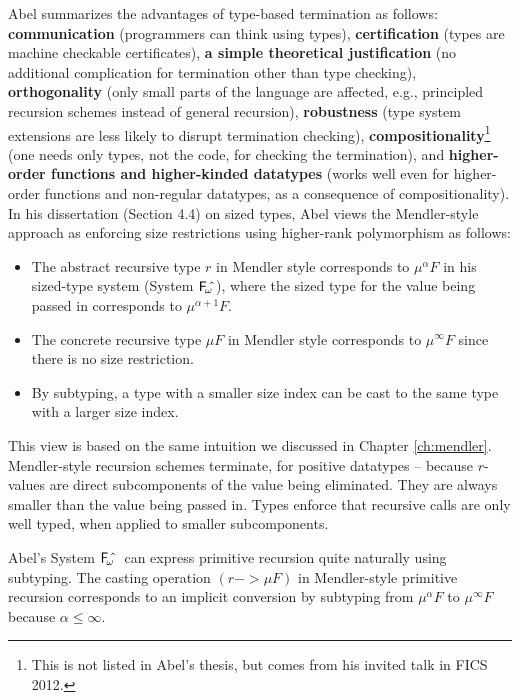 \documentclass[a4paper,UKenglish]{lipics}
\newcommand{\eg}[0]{{e.g.}}
\newcommand{\Fwhat}[0]{{\ensuremath{\mathsf{\uppercase{F}}_{\!\omega}\!\!\char`\^}}}
\begin{document}
Abel \cite{abel06phd,Abel12talkFICS} summarizes the advantages of
type-based termination as follows:
\textbf{communication} (programmers can think using types),
\textbf{certification} (types are machine checkable certificates),
\textbf{a simple theoretical justification}
        (no additional complication for termination other than type checking),
\textbf{orthogonality} (only small parts of the language are affected,
        \eg, principled recursion schemes instead of general recursion),
\textbf{robustness} (type system extensions are less likely to
                        disrupt termination checking),
\textbf{compositionality}\footnote{This is not listed in Abel's thesis,
                                but comes from his invited talk in FICS 2012.}
        (one needs only types, not the code, for checking the termination), and
\textbf{higher-order functions and higher-kinded datatypes}
        (works well even for higher-order functions and non-regular datatypes,
        as a consequence of compositionality).
In his dissertation \cite{abel06phd} (Section 4.4) on sized types,
Abel views the Mendler-style approach as enforcing size restrictions
using higher-rank polymorphism as follows:
\begin{itemize}
\item The abstract recursive type $r$ in Mendler style corresponds to
        $\mu^\alpha F$ in his sized-type system (System \Fwhat),
        where the sized type
        for the value being passed in corresponds to $\mu^{\alpha+1} F$.
\item The concrete recursive type $\mu F$ in Mendler style corresponds to
        $\mu^\infty F$ since there is no size restriction.
\item By subtyping, a type with a smaller size index can be cast to
        the same type with a larger size index.
\end{itemize}
This view is based on the same intuition we discussed in
Chapter \ref{ch:mendler}. Mendler-style recursion schemes terminate, for
positive datatypes -- because $r$-values are direct subcomponents
of the value being eliminated. They are always smaller
than the value being passed in. Types enforce that recursive calls
are only well typed, when applied to smaller subcomponents.

Abel's System \Fwhat\ can express primitive recursion quite naturally
using subtyping. The casting operation $(r -> \mu F)$ in Mendler-style
primitive recursion corresponds to an implicit conversion by subtyping
from $\mu^\alpha F$ to $\mu^\infty F$ because $\alpha \leq \infty$.
\end{document}
